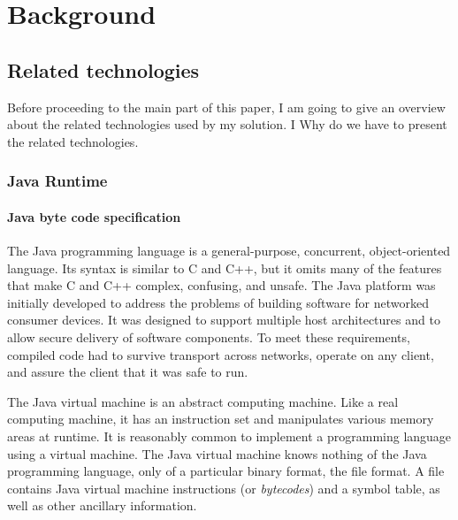 \chapter{Background}

\section{Related technologies}
Before proceeding to the main part of this paper, I am going to give an overview
about the related technologies used by my solution. I Why do we have to present
the related technologies.

\subsection{Java Runtime}

\subsubsection{Java byte code specification}
The Java \cite{JavaSpec} programming language is a general-purpose, concurrent,
object-oriented language. Its syntax is similar to C and C++, but it omits many
of the features that make C and C++ complex, confusing, and unsafe. The Java
platform was initially developed to address the problems of building software
for networked consumer devices. It was designed to support multiple host
architectures and to allow secure delivery of software components. To meet these
requirements, compiled code had to survive transport across networks, operate on
any client, and assure the client that it was safe to run.

The Java virtual machine is an abstract computing machine. Like a real computing
machine, it has an instruction set and manipulates various memory areas at
runtime. It is reasonably common to implement a programming language using a
virtual machine. The Java virtual machine knows nothing of the Java programming
language, only of a particular binary format, the   file format. A
 file contains Java virtual machine instructions (or 
\emph{bytecodes}) and a symbol table, as well as other ancillary information.

